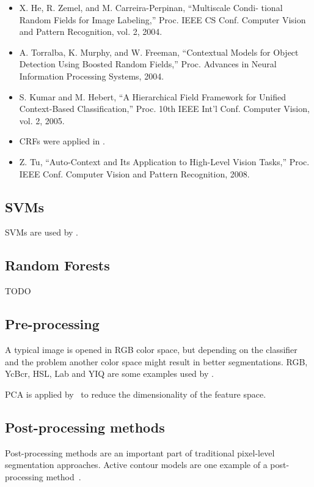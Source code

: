 \begin{itemize}
    \item X. He, R. Zemel, and M. Carreira-Perpinan, “Multiscale Condi-
          tional Random Fields for Image Labeling,” Proc. IEEE CS Conf.
          Computer Vision and Pattern Recognition, vol. 2, 2004.
    \item A. Torralba, K. Murphy, and W. Freeman, “Contextual Models for
          Object Detection Using Boosted Random Fields,” Proc. Advances in
          Neural Information Processing Systems, 2004.
    \item S. Kumar and M. Hebert, “A Hierarchical Field Framework for
          Unified Context-Based Classification,” Proc. 10th IEEE Int’l Conf.
          Computer Vision, vol. 2, 2005.
    \item \Glspl{CRF} were applied in \cite{shotton2006textonboost}.
    \item Z. Tu, “Auto-Context and Its Application to High-Level Vision
          Tasks,” Proc. IEEE Conf. Computer Vision and Pattern Recognition,
          2008.
\end{itemize}


\subsection{SVMs}

\Glspl{SVM} are used by \cite{yang2012layered}.


\subsection{Random Forests}

TODO


\subsection{Pre-processing}%
\label{subsec:preprocessing}%
A typical image is opened in RGB color space, but depending on the classifier
and the problem another color space might result in better segmentations. RGB,
YcBcr, HSL, Lab and YIQ are some examples used by \cite{cohen2015memory}.

\Gls{PCA} is applied by~\cite{chen2011pixel} to reduce the dimensionality of
the feature space.

\subsection{Post-processing methods}%
\label{subsec:post-processing-methods}%
Post-processing methods are an important part of traditional pixel-level
segmentation approaches. Active contour models are one example of a
post-processing method~\cite{kass1988snakes}.


